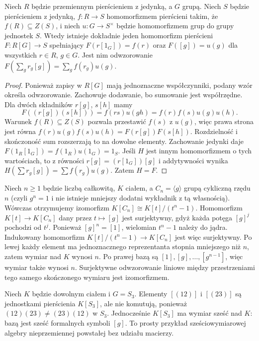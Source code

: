 \begin{twierdzenie}
\label{aa:tw:nc-group-ring-universal}
Niech $R$ będzie przemiennym pierścieniem z jedynką,
a $G$ grupą. Niech $S$ będzie pierścieniem z jedynką,
$f:R\to S$ homomorfizmem pierścieni takim, że
$f(R)\subseteq Z(S)$, i niech $u:G\to S^\times$
będzie homomorfizmem grup do grupy jednostek $S$.
Wtedy istnieje dokładnie jeden homomorfizm pierścieni
$F:R[G]\to S$ spełniający $F(r[1_G])=f(r)$
oraz $F([g])=u(g)$ dla wszystkich $r\in R$, $g\in G$.
Jest nim odwzorowanie
$F(\sum_g r_g[g])=\sum_g f(r_g)u(g)$.
\end{twierdzenie}
\begin{proof}
Ponieważ zapisy w $R[G]$ mają jednoznaczne współczynniki,
podany wzór określa odwzorowanie. Zachowuje dodawanie,
bo sumowanie jest współrzędne. Dla dwóch składników
$r[g]$, $s[h]$ mamy
\[
F((r[g])(s[h]))=f(rs)u(gh)
=f(r)f(s)u(g)u(h).
\]
Warunek $f(R)\subseteq Z(S)$ pozwala przestawić
$f(s)$ z $u(g)$, więc prawa strona jest równa
$f(r)u(g)f(s)u(h)=F(r[g])F(s[h])$.
Rozdzielność i skończoność sum rozszerzają to na
dowolne elementy. Zachowanie jedynki daje
$F(1_R[1_G])=f(1_R)u(1_G)=1_S$.
Jeśli $H$ jest innym homomorfizmem o tych wartościach,
to z równości $r[g]=(r[1_G])[g]$ i addytywności
wynika $H(\sum r_g[g])=\sum f(r_g)u(g)$.
Zatem $H=F$.
\end{proof}

\begin{przyklad}
\label{aa:prz:nc-cyclic-ring}
Niech $n\ge1$ będzie liczbą całkowitą, $K$ ciałem,
a $C_n=\langle g\rangle$ grupą cykliczną rzędu
$n$ (czyli $g^n=1$ i nie istnieje mniejszy dodatni
wykładnik z tą własnością). Wówczas otrzymujemy izomorfizm
$K[C_n]\cong K[t]/(t^n-1)$. Homomorfizm
$K[t]\to K[C_n]$ dany przez $t\mapsto[g]$
jest surjektywny, gdyż każda potęga $[g]^j$
pochodzi od $t^j$. Ponieważ $[g]^n=[1]$,
wielomian $t^n-1$ należy do jądra. Indukowany
homomorfizm $K[t]/(t^n-1)\to K[C_n]$ jest więc
surjektywny. Po lewej każdy element ma jednoznacznego
reprezentanta stopnia mniejszego niż $n$, zatem
wymiar nad $K$ wynosi $n$. Po prawej bazą są
$[1],[g],\ldots,[g^{n-1}]$, więc wymiar także wynosi
$n$. Surjektywne odwzorowanie liniowe między
przestrzeniami tego samego skończonego wymiaru
jest izomorfizmem.
\end{przyklad}

\begin{przyklad}
\label{aa:prz:nc-s3-ring}
Niech $K$ będzie dowolnym ciałem i $G=S_3$.
Elementy $[(12)]$ i $[(23)]$ są jednostkami pierścienia
$K[S_3]$, ale nie komutują, ponieważ
$(12)(23)\ne(23)(12)$ w $S_3$.
Jednocześnie $K[S_3]$ ma wymiar sześć nad $K$:
bazą jest sześć formalnych symboli $[g]$.
To prosty przykład sześciowymiarowej algebry
nieprzemiennej powstałej bez udziału macierzy.
\end{przyklad}


